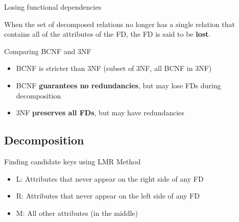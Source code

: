 \begin{definition}
    {Losing functional dependencies}

    When  the set of decomposed relations no longer has a single relation that contains all of the attributes of the FD, the FD is said to be \textbf{lost}.
\end{definition}

\begin{theorem}
    {Comparing BCNF and 3NF}

    \begin{itemize}
        \item BCNF is stricter than 3NF (subset of 3NF, all BCNF in 3NF)
        \item BCNF \textbf{guarantees no redundancies}, but may lose FDs during decomposition
        \item 3NF \textbf{preserves all FDs}, but may have redundancies
    \end{itemize}
\end{theorem}

\subsection{Decomposition}

\begin{knBox}
    {Finding candidate keys using LMR Method}
    \begin{itemize}
        \item L: Attributes that never appear on the right side of any FD
        \item R: Attributes that never appear on the left side of any FD
        \item M: All other attributes (in the middle)
    \end{itemize}
\end{knBox}

